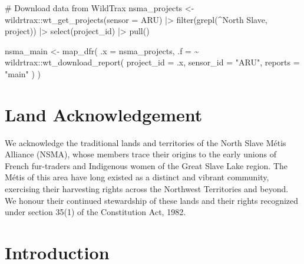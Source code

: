 \documentclass[
  letterpaper,
  DIV=11,
  numbers=noendperiod,
  oneside]{scrartcl}
\newenvironment{Shaded}{\begin{snugshade}}{\end{snugshade}}
\newcommand{\AttributeTok}[1]{\textcolor[rgb]{0.40,0.45,0.13}{#1}}
\newcommand{\CommentTok}[1]{\textcolor[rgb]{0.37,0.37,0.37}{#1}}
\newcommand{\FunctionTok}[1]{\textcolor[rgb]{0.28,0.35,0.67}{#1}}
\newcommand{\NormalTok}[1]{\textcolor[rgb]{0.00,0.23,0.31}{#1}}
\newcommand{\OtherTok}[1]{\textcolor[rgb]{0.00,0.23,0.31}{#1}}
\newcommand{\SpecialCharTok}[1]{\textcolor[rgb]{0.37,0.37,0.37}{#1}}
\newcommand{\StringTok}[1]{\textcolor[rgb]{0.13,0.47,0.30}{#1}}
\begin{document}
\begin{Shaded}
\begin{Highlighting}[]
\CommentTok{\# Download data from WildTrax}
\NormalTok{nsma\_projects }\OtherTok{\textless{}{-}}\NormalTok{ wildrtrax}\SpecialCharTok{::}\FunctionTok{wt\_get\_projects}\NormalTok{(}\AttributeTok{sensor =} \StringTok{\textquotesingle{}ARU\textquotesingle{}}\NormalTok{) }\SpecialCharTok{|\textgreater{}}
  \FunctionTok{filter}\NormalTok{(}\FunctionTok{grepl}\NormalTok{(}\StringTok{\textquotesingle{}\^{}North Slave\textquotesingle{}}\NormalTok{, project)) }\SpecialCharTok{|\textgreater{}}
  \FunctionTok{select}\NormalTok{(project\_id) }\SpecialCharTok{|\textgreater{}}
  \FunctionTok{pull}\NormalTok{()}

\NormalTok{nsma\_main }\OtherTok{\textless{}{-}}
  \FunctionTok{map\_dfr}\NormalTok{(}
    \AttributeTok{.x =}\NormalTok{ nsma\_projects,}
    \AttributeTok{.f =} \SpecialCharTok{\textasciitilde{}}\NormalTok{ wildrtrax}\SpecialCharTok{::}\FunctionTok{wt\_download\_report}\NormalTok{(}
      \AttributeTok{project\_id =}\NormalTok{ .x,}
      \AttributeTok{sensor\_id =} \StringTok{"ARU"}\NormalTok{,}
      \AttributeTok{reports =} \StringTok{"main"}
\NormalTok{    )}
\NormalTok{  )}
\end{Highlighting}
\end{Shaded}

\section{Land Acknowledgement}\label{land-acknowledgement}

We acknowledge the traditional lands and territories of the North Slave
Métis Alliance (NSMA), whose members trace their origins to the early
unions of French fur-traders and Indigenous women of the Great Slave
Lake region. The Métis of this area have long existed as a distinct and
vibrant community, exercising their harvesting rights across the
Northwest Territories and beyond. We honour their continued stewardship
of these lands and their rights recognized under section 35(1) of the
Constitution Act, 1982.

\section{Introduction}\label{introduction}
\end{document}
